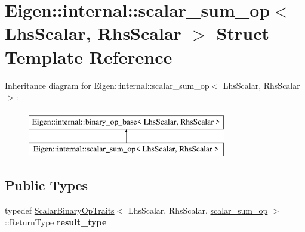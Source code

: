 \hypertarget{struct_eigen_1_1internal_1_1scalar__sum__op}{}\section{Eigen\+::internal\+::scalar\+\_\+sum\+\_\+op$<$ Lhs\+Scalar, Rhs\+Scalar $>$ Struct Template Reference}
\label{struct_eigen_1_1internal_1_1scalar__sum__op}
Inheritance diagram for Eigen\+::internal\+::scalar\+\_\+sum\+\_\+op$<$ Lhs\+Scalar, Rhs\+Scalar $>$\+:\begin{figure}[H]
\begin{center}
\leavevmode
\includegraphics[height=2.000000cm]{struct_eigen_1_1internal_1_1scalar__sum__op}
\end{center}
\end{figure}
\subsection*{Public Types}
\begin{DoxyCompactItemize}
\item 
\mbox{\label{struct_eigen_1_1internal_1_1scalar__sum__op_a3e94ce74f8d5793ccbba403af196f95d}} 
typedef \mbox{\hyperlink{struct_eigen_1_1_scalar_binary_op_traits}{Scalar\+Binary\+Op\+Traits}}$<$ Lhs\+Scalar, Rhs\+Scalar, \mbox{\hyperlink{struct_eigen_1_1internal_1_1scalar__sum__op}{scalar\+\_\+sum\+\_\+op}} $>$\+::Return\+Type {\bfseries result\+\_\+type}
\end{DoxyCompactItemize}
